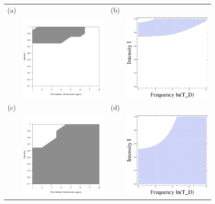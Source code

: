 \begin{figure}[htbp]
\begin{center}
\begin{tabular}{cccc}
(a)&&(b)&\\
&\includegraphics[width=2.5in]{pplot75.pdf} &&\includegraphics[width=2.5in]{p0p75xequiv.pdf}\\
(c)&&(d)&\\
&\includegraphics[width=2.5in]{pplot10.pdf} &&\includegraphics[width=2.5in]{p0p2xequiv.pdf} \end{tabular}

\end{center}
\end{figure}
